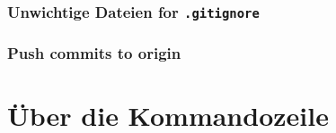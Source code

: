 \documentclass[12pt,ngerman]{beamer}
\begin{document}
\begin{frame}
\frametitle{Unwichtige Dateien for \texttt{.gitignore}}

\begin{center}
\end{center}

\end{frame}

\begin{frame}
\frametitle{Push commits to origin}

\begin{center}
\end{center}

\end{frame}

\section{Über die Kommandozeile}
\end{document}
